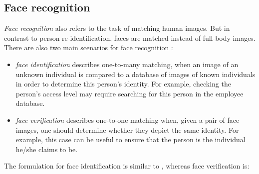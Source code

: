 
\subsection{Face recognition}
\label{sect:face}
\textit{Face recognition} also refers to the task of matching human images. But in contrast to person re-identification, faces are matched instead of full-body images.
There are also two main scenarios for face recognition \citep{jafri2009survey}:
\begin{itemize}
\item \textit{face identification} describes one-to-many matching, when an image of an unknown individual is compared to a database of images of known individuals in order to determine this person's identity. For example, checking the person's access level may require searching for this person in the employee database. 
\item \textit{face verification} describes one-to-one matching when, given a pair of face images, one should determine whether they depict the same identity. For example, this case can be useful to ensure that the person is the individual he/she claims to be.
\end{itemize}

The formulation for face identification is similar to , whereas face verification is:

\begin{problem}
\label{pr:verification}
\end{problem}



